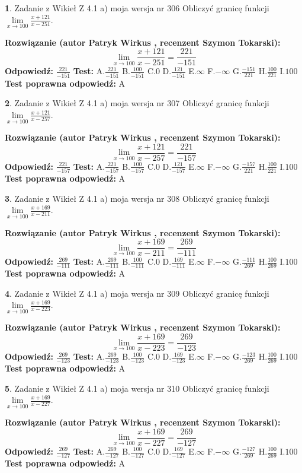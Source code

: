 \documentclass[12pt, a4paper]{article}
\theoremstyle{definition} %
\newtheorem{zad}{}
\newcommand{\zadStart}[1]{\begin{zad}#1\newline}
\newcommand{\zadStop}{\end{zad}}
\newcommand{\rozwStart}[2]{\noindent \textbf{Rozwiązanie (autor #1 , recenzent #2): }\newline}
\newcommand{\rozwStop}{\newline}
\newcommand{\odpStart}{\noindent \textbf{Odpowiedź:}\newline}
\newcommand{\odpStop}{\newline}
\newcommand{\testStart}{\noindent \textbf{Test:}\newline}
\newcommand{\testStop}{\newline}
\newcommand{\kluczStart}{\noindent \textbf{Test poprawna odpowiedź:}\newline}
\newcommand{\kluczStop}{\newline}
\begin{document}
\zadStart{Zadanie z Wikieł Z 4.1 a) moja wersja nr 306}
Obliczyć granicę funkcji $\lim\limits_{x\to100}\frac{x+121}{x-251}$.
\zadStop
\rozwStart{Patryk Wirkus}{Szymon Tokarski}
$$\lim\limits_{x\to100}\frac{x+121}{x-251} = \frac{221}{-151}$$
\rozwStop
\odpStart
$\frac{221}{-151}$
\odpStop
\testStart
A.$\frac{221}{-151}$
B.$\frac{100}{-151}$
C.$0$
D.$\frac{121}{-151}$
E.$\infty$
F.$-\infty$
G.$\frac{-151}{221}$
H.$\frac{100}{221}$
I.$100$
\testStop
\kluczStart
A
\kluczStop



\zadStart{Zadanie z Wikieł Z 4.1 a) moja wersja nr 307}
Obliczyć granicę funkcji $\lim\limits_{x\to100}\frac{x+121}{x-257}$.
\zadStop
\rozwStart{Patryk Wirkus}{Szymon Tokarski}
$$\lim\limits_{x\to100}\frac{x+121}{x-257} = \frac{221}{-157}$$
\rozwStop
\odpStart
$\frac{221}{-157}$
\odpStop
\testStart
A.$\frac{221}{-157}$
B.$\frac{100}{-157}$
C.$0$
D.$\frac{121}{-157}$
E.$\infty$
F.$-\infty$
G.$\frac{-157}{221}$
H.$\frac{100}{221}$
I.$100$
\testStop
\kluczStart
A
\kluczStop



\zadStart{Zadanie z Wikieł Z 4.1 a) moja wersja nr 308}
Obliczyć granicę funkcji $\lim\limits_{x\to100}\frac{x+169}{x-211}$.
\zadStop
\rozwStart{Patryk Wirkus}{Szymon Tokarski}
$$\lim\limits_{x\to100}\frac{x+169}{x-211} = \frac{269}{-111}$$
\rozwStop
\odpStart
$\frac{269}{-111}$
\odpStop
\testStart
A.$\frac{269}{-111}$
B.$\frac{100}{-111}$
C.$0$
D.$\frac{169}{-111}$
E.$\infty$
F.$-\infty$
G.$\frac{-111}{269}$
H.$\frac{100}{269}$
I.$100$
\testStop
\kluczStart
A
\kluczStop



\zadStart{Zadanie z Wikieł Z 4.1 a) moja wersja nr 309}
Obliczyć granicę funkcji $\lim\limits_{x\to100}\frac{x+169}{x-223}$.
\zadStop
\rozwStart{Patryk Wirkus}{Szymon Tokarski}
$$\lim\limits_{x\to100}\frac{x+169}{x-223} = \frac{269}{-123}$$
\rozwStop
\odpStart
$\frac{269}{-123}$
\odpStop
\testStart
A.$\frac{269}{-123}$
B.$\frac{100}{-123}$
C.$0$
D.$\frac{169}{-123}$
E.$\infty$
F.$-\infty$
G.$\frac{-123}{269}$
H.$\frac{100}{269}$
I.$100$
\testStop
\kluczStart
A
\kluczStop



\zadStart{Zadanie z Wikieł Z 4.1 a) moja wersja nr 310}
Obliczyć granicę funkcji $\lim\limits_{x\to100}\frac{x+169}{x-227}$.
\zadStop
\rozwStart{Patryk Wirkus}{Szymon Tokarski}
$$\lim\limits_{x\to100}\frac{x+169}{x-227} = \frac{269}{-127}$$
\rozwStop
\odpStart
$\frac{269}{-127}$
\odpStop
\testStart
A.$\frac{269}{-127}$
B.$\frac{100}{-127}$
C.$0$
D.$\frac{169}{-127}$
E.$\infty$
F.$-\infty$
G.$\frac{-127}{269}$
H.$\frac{100}{269}$
I.$100$
\testStop
\kluczStart
A
\kluczStop
\end{document}
